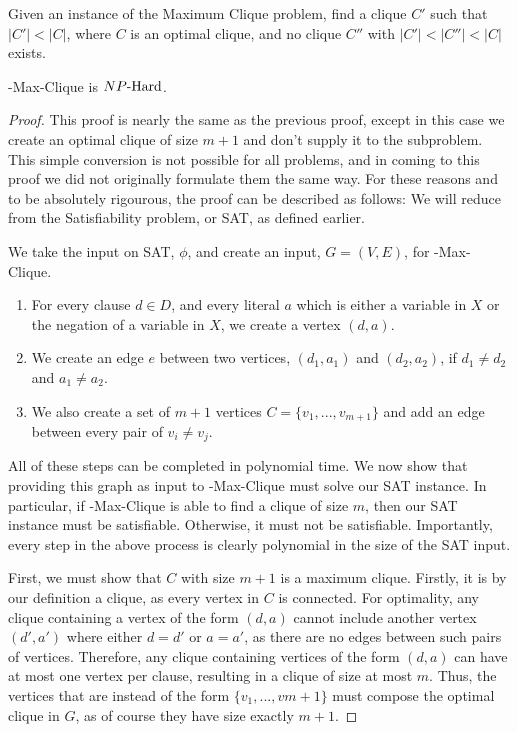 \begin{definition}
Given an instance of the Maximum Clique problem, find a clique $C'$ such that $|C'| < |C|$, where $C$ is an optimal clique, and no clique $C''$ with $|C'| < |C''| < |C|$ exists.
\end{definition}
\begin{theorem}
    \exb{}-Max-Clique is ${NP\text{-Hard{}}}$.
\end{theorem}
\begin{proof}
    This proof is nearly the same as the previous proof, except in this case we create an optimal clique of size $m+1$ and don't supply it to the subproblem. This simple conversion is not possible for all problems, and in coming to this proof we did not originally formulate them the same way. For these reasons and to be absolutely rigourous, the proof can be described as follows:
 We will reduce from the Satisfiability problem, or SAT, as defined earlier.

We take the input on SAT, $\phi$, and create an input, $G = (V, E)$, for \exb{}-Max-Clique. 
\begin{enumerate}
    \item For every clause $d \in D$, and every literal $a$ which is either a variable in $X$ or the negation of a variable in $X$, we create a vertex $(d, a)$.
    \item We create an edge $e$ between two vertices, $(d_1, a_1)$ and $(d_2, a_2)$, if $d_1 \neq d_2$ and $a_1 \neq a_2$. 
    \item We also create a set of $m+1$ vertices $C =\{v_1, ..., v_{m+1}\}$ and add an edge between every pair of $v_i \neq v_j$. 
\end{enumerate} 
All of these steps can be completed in polynomial time.
We now show that providing this graph as input to \exb{}-Max-Clique must solve our SAT instance. In particular, if \exb{}-Max-Clique is able to find a clique of size $m$, then our SAT instance must be satisfiable. Otherwise, it must not be satisfiable. Importantly, every step in the above process is clearly polynomial in the size of the SAT input.

First, we must show that $C$ with size $m+1$ is a maximum clique. Firstly, it is by our definition a clique, as every vertex in $C$ is connected. For optimality, any clique containing a vertex of the form $(d, a)$ cannot include another vertex $(d', a')$ where either $d = d'$ or $a = a'$, as there are no edges between such pairs of vertices. Therefore, any clique containing vertices of the form $(d, a)$ can have at most one vertex per clause, resulting in a clique of size at most $m$. Thus, the vertices that are instead of the form $\{v_1, ..., v{m+1}\}$ must compose the optimal clique in $G$, as of course they have size exactly $m+1$.


\end{proof}
